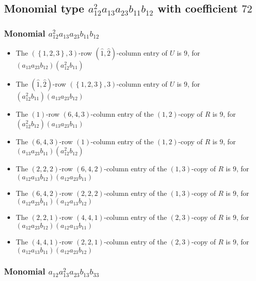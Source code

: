 \documentclass{article}
\begin{document}
\subsection{Monomial type $ a_{12}^{2} a_{13} a_{23} b_{11} b_{12} $ with coefficient $ 72 $}

\subsubsection{Monomial $ a_{12}^{2} a_{13} a_{23} b_{11} b_{12} $}

\begin{itemize}
\item The $ \left(\left\{1, 2, 3\right\}, 3\right) $-row $ (\hat{1}, \hat{2}) $-column entry of $U$ is $ 9 $, for $( a_{13} a_{23} b_{12} )( a_{12}^{2} b_{11} )$ 
\item The $(\hat{1}, \hat{2})$-row $ \left(\left\{1, 2, 3\right\}, 3\right) $-column entry of $U$ is $ 9 $, for $( a_{12}^{2} b_{11} )( a_{13} a_{23} b_{12} )$ 
\item The $(1)$-row $(6, 4, 3)$-column entry of the $ \left(1, 2\right) $-copy of $R$ is $ 9 $, for $( a_{12}^{2} b_{12} )( a_{13} a_{23} b_{11} )$ 
\item The $(6, 4, 3)$-row $(1)$-column entry of the $ \left(1, 2\right) $-copy of $R$ is $ 9 $, for $( a_{13} a_{23} b_{11} )( a_{12}^{2} b_{12} )$ 
\item The $(2, 2, 2)$-row $(6, 4, 2)$-column entry of the $ \left(1, 3\right) $-copy of $R$ is $ 9 $, for $( a_{12} a_{13} b_{12} )( a_{12} a_{23} b_{11} )$ 
\item The $(6, 4, 2)$-row $(2, 2, 2)$-column entry of the $ \left(1, 3\right) $-copy of $R$ is $ 9 $, for $( a_{12} a_{23} b_{11} )( a_{12} a_{13} b_{12} )$ 
\item The $(2, 2, 1)$-row $(4, 4, 1)$-column entry of the $ \left(2, 3\right) $-copy of $R$ is $ 9 $, for $( a_{12} a_{23} b_{12} )( a_{12} a_{13} b_{11} )$ 
\item The $(4, 4, 1)$-row $(2, 2, 1)$-column entry of the $ \left(2, 3\right) $-copy of $R$ is $ 9 $, for $( a_{12} a_{13} b_{11} )( a_{12} a_{23} b_{12} )$ 
\end{itemize}
\subsubsection{Monomial $ a_{12} a_{13}^{2} a_{23} b_{13} b_{33} $}
\end{document}
